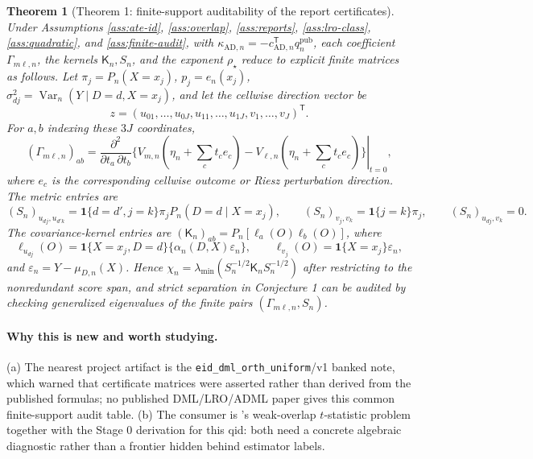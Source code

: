 \documentclass[11pt]{article}
\newcommand{\one}{\mathbf{1}}
\newcommand{\transpose}{\mathsf{T}}
\theoremstyle{definition}
\theoremstyle{plain}
\newtheorem{theorem}{Theorem}
\theoremstyle{remark}
\begin{document}
\begin{theorem}[Theorem 1: finite-support auditability of the report certificates]\label{thm:finite-audit}
Under Assumptions \ref{ass:ate-id}, \ref{ass:overlap}, \ref{ass:reports},
\ref{ass:lro-class}, \ref{ass:quadratic}, and \ref{ass:finite-audit}, with
\(\kappa_{\mathrm{AD},n}=-c_{\mathrm{AD},n}^{\transpose}
q^{\mathrm{pub}}_n\), each
coefficient \(\Gamma_{m\ell,n}\), the kernels \(\mathsf K_n,S_n\), and the exponent
\(\rho_\star\) reduce to explicit finite matrices as follows.  Let
\(\pi_j=P_n(X=x_j)\), \(p_j=e_n(x_j)\),
\(\sigma_{dj}^2=\operatorname{Var}_n(Y\mid D=d,X=x_j)\), and let the
cellwise direction vector be
\[
z=(u_{01},\ldots,u_{0J},u_{11},\ldots,u_{1J},v_1,\ldots,v_J)^\transpose.
\]
For \(a,b\) indexing these \(3J\) coordinates,
\[
(\Gamma_{m\ell,n})_{ab}
=\left.
\frac{\partial^2}{\partial t_a\,\partial t_b}
\{V_{m,n}(\eta_n+\sum_c t_c e_c)-V_{\ell,n}(\eta_n+\sum_c t_c e_c)\}
\right|_{t=0},
\]
where \(e_c\) is the corresponding cellwise outcome or Riesz perturbation
direction.  The metric entries are
\[
(S_n)_{u_{dj},u_{d'k}}=\one\{d=d',j=k\}\pi_jP_n(D=d\mid X=x_j),\qquad
(S_n)_{v_j,v_k}=\one\{j=k\}\pi_j,\qquad
(S_n)_{u_{dj},v_k}=0.
\]
The covariance-kernel entries are \((\mathsf K_n)_{ab}=P_n[\ell_a(O)\ell_b(O)]\), where
\[
\ell_{u_{dj}}(O)=\one\{X=x_j,D=d\}\{\alpha_n(D,X)\varepsilon_n\},\qquad
\ell_{v_j}(O)=\one\{X=x_j\}\varepsilon_n,
\]
and \(\varepsilon_n=Y-\mu_{D,n}(X)\).  Hence
\(\chi_n=\lambda_{\min}(S_n^{-1/2}\mathsf K_nS_n^{-1/2})\) after restricting to the
nonredundant score span, and strict separation in Conjecture 1 can be audited
by checking generalized eigenvalues of the finite pairs
\((\Gamma_{m\ell,n},S_n)\).
\end{theorem}
\paragraph{Why this is new and worth studying.}
(a) The nearest project artifact is the \texttt{eid\_dml\_orth\_uniform}/v1
banked note, which warned that certificate matrices were asserted rather than
derived from the published formulas; no published DML/LRO/ADML paper gives
this common finite-support audit table.  (b) The consumer is
\citet{Dorn2025WeakOverlapDR}'s weak-overlap \(t\)-statistic problem together
with the Stage 0 derivation for this qid: both need a concrete algebraic
diagnostic rather than a frontier hidden behind estimator labels.
\end{document}
